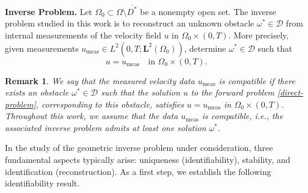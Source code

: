 \documentclass[a4paper,12pt,reqno,natbib]{amsart}
\newtheorem{remark}[theorem]{Remark}
\def\L{\textbf{L}}
\begin{document}
\medskip

\noindent\textbf{Inverse Problem.}  
Let \( \Omega_0 \subset \Omega \setminus \overline{D^*} \) be a nonempty open set. The inverse problem studied in this work is to reconstruct an unknown obstacle \( \omega^* \in \mathcal{D} \) from internal measurements of the velocity field \( u \) in \( \Omega_0 \times (0, T) \). More precisely, given measurements \( u_{\text{meas}} \in L^2(0,T; \L^2(\Omega_0)) \), determine \( \omega^* \in \mathcal{D} \) such that
\[
u = u_{\text{meas}} \quad \text{in } \Omega_0 \times (0, T).
\]



\begin{remark}
We say that the measured velocity data \( u_{\text{meas}} \) is compatible if there exists an obstacle \( \omega^* \in \mathcal{D} \) such that the solution \( u \) to the forward problem \eqref{direct-problem}, corresponding to this obstacle, satisfies \( u = u_{\text{meas}} \) in \( \Omega_0 \times (0, T) \). Throughout this work, we assume that the data \( u_{\text{meas}} \) is compatible, i.e., the associated inverse problem admits at least one solution \( \omega^* \).
\end{remark}



In the study of the geometric inverse problem under consideration, three fundamental aspects typically arise: uniqueness (identifiability), stability, and identification (reconstruction). As a first step, we establish the following identifiability result.
\end{document}
